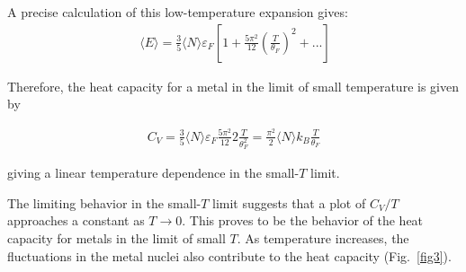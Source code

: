 \documentclass[book.tex]{subfiles}
\begin{document}
A precise calculation of this low-temperature expansion gives:
\begin{align}\
\langle E \rangle = \frac{3}{5}\langle N \rangle \varepsilon_F \left[1 +\frac{5\pi^2}{12}\left(\frac{T}{\theta_F}\right)^2 +...\right]
\end{align}

Therefore, the heat capacity for a metal in the limit of small temperature is given by

\begin{align}
C_V = \frac{3}{5}\langle N \rangle \varepsilon_F \frac{5\pi^2}{12}2\frac{T}{\theta_F^2} = \frac{\pi^2}{2}\langle N \rangle k_B\frac{T}{\theta_F}
\end{align}

\noindent giving a linear temperature dependence in the small-$T$ limit.

The limiting behavior in the small-$T$ limit suggests that a plot of $C_V/T$ approaches a constant as $T\rightarrow 0$. This proves to be the behavior of the heat capacity for metals in the limit of small $T$. As temperature increases, the fluctuations in the metal nuclei also contribute to the heat capacity (Fig.~\ref{fig3}).
\end{document}
